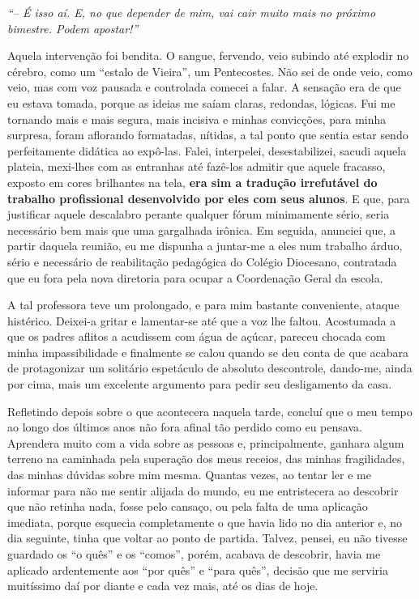 \textit{``-- É isso aí.
E, no que depender de mim, vai cair muito mais no próximo bimestre.
Podem apostar!''}

Aquela intervenção foi bendita.
O sangue, fervendo, veio subindo até explodir no cérebro, como um ``estalo de Vieira'', um Pentecostes.
Não sei de onde veio, como veio, mas com voz pausada e controlada comecei a falar.
A sensação era de que eu estava tomada, porque as ideias me saíam claras, redondas, lógicas.
Fui me tornando mais e mais segura, mais incisiva e minhas convicções, para minha surpresa, foram aflorando formatadas, nítidas, a tal ponto que sentia estar sendo perfeitamente didática ao expô-las.
Falei, interpelei, desestabilizei, sacudi aquela plateia, mexi-lhes com as entranhas até fazê-los admitir que aquele fracasso, exposto em cores brilhantes na tela, \textbf{era sim a tradução irrefutável do trabalho profissional desenvolvido por eles com seus alunos}.
E que, para justificar aquele descalabro perante qualquer fórum minimamente sério, seria necessário bem mais que uma gargalhada irônica.
Em seguida, anunciei que, a partir daquela reunião, eu me dispunha a juntar-me a eles num trabalho árduo, sério e necessário de reabilitação pedagógica do Colégio Diocesano, contratada que eu fora pela nova diretoria para ocupar a Coordenação Geral da escola.

A tal professora teve um prolongado, e para mim bastante conveniente, ataque histérico.
Deixei-a gritar e lamentar-se até que a voz lhe faltou.
Acostumada a que os padres aflitos a acudissem com água de açúcar, pareceu chocada com minha impassibilidade e finalmente se calou quando se deu conta de que acabara de protagonizar um solitário espetáculo de absoluto descontrole, dando-me, ainda por cima, mais um excelente argumento para pedir seu desligamento da casa.

Refletindo depois sobre o que acontecera naquela tarde, concluí que o meu tempo ao longo dos últimos anos não fora afinal tão perdido como eu pensava.
Aprendera muito com a vida sobre as pessoas e, principalmente, ganhara algum terreno na caminhada pela superação dos meus receios, das minhas fragilidades, das minhas dúvidas sobre mim mesma.
Quantas vezes, ao tentar ler e me informar para não me sentir alijada do mundo, eu me entristecera ao descobrir que não retinha nada, fosse pelo cansaço, ou pela falta de uma aplicação imediata, porque esquecia completamente o que havia lido no dia anterior e, no dia seguinte, tinha que voltar ao ponto de partida.
Talvez, pensei, eu não tivesse guardado os ``o quês'' e os ``comos'', porém, acabava de descobrir, havia me aplicado ardentemente aos ``por quês'' e ``para quês'', decisão que me serviria muitíssimo daí por diante e cada vez mais, até os dias de hoje.


